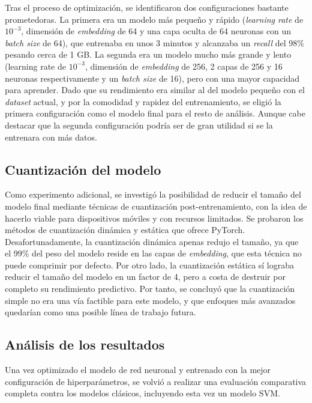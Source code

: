 Tras el proceso de optimización, se identificaron dos configuraciones bastante prometedoras. La primera era un modelo más pequeño y rápido (\textit{learning rate} de $10^{-3}$, dimensión de \textit{embedding} de 64 y una capa oculta de 64 neuronas con un \textit{batch size} de 64), que entrenaba en unos 3 minutos y alcanzaba un \textit{recall} del 98\% pesando cerca de 1 GB. La segunda era un modelo mucho más grande y lento (learning rate de $10^{-3}$, dimensión de \textit{embedding} de 256, 2 capas de 256 y 16 neuronas respectivamente y un \textit{batch size} de 16), pero con una mayor capacidad para aprender. Dado que su rendimiento era similar al del modelo pequeño con el \textit{dataset} actual, y por la comodidad y rapidez del entrenamiento, se eligió la primera configuración como el modelo final para el resto de análisis. Aunque cabe destacar que la segunda configuración podría ser de gran utilidad si se la entrenara con más datos.

\subsection{Cuantización del modelo}

Como experimento adicional, se investigó la posibilidad de reducir el tamaño del modelo final mediante técnicas de cuantización post-entrenamiento, con la idea de hacerlo viable para dispositivos móviles y con recursos limitados. Se probaron los métodos de cuantización dinámica y estática que ofrece PyTorch. Desafortunadamente, la cuantización dinámica apenas redujo el tamaño, ya que el 99\% del peso del modelo reside en las capas de \textit{embedding}, que esta técnica no puede comprimir por defecto. Por otro lado, la cuantización estática sí lograba reducir el tamaño del modelo en un factor de 4, pero a costa de destruir por completo su rendimiento predictivo. Por tanto, se concluyó que la cuantización simple no era una vía factible para este modelo, y que enfoques más avanzados quedarían como una posible línea de trabajo futura.

\subsection{Análisis de los resultados}

Una vez optimizado el modelo de red neuronal y entrenado con la mejor configuración de hiperparámetros, se volvió a realizar una evaluación comparativa completa contra los modelos clásicos, incluyendo esta vez un modelo SVM.

